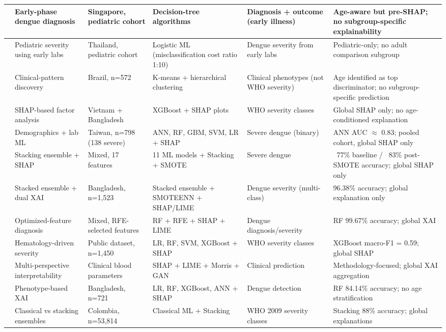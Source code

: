 \documentclass[12pt, a4paper]{report}
\begin{document}
\begin{xltabular}{\textwidth}{|c|X|X|X|X|X|}
\cite{tanner2008} & Early-phase dengue diagnosis & Singapore, pediatric cohort & Decision-tree algorithms & Diagnosis + outcome (early illness) & Age-aware but pre-SHAP; no subgroup-specific explainability \\
\hline
\cite{potts2010} & Pediatric severity using early labs & Thailand, pediatric cohort & Logistic ML (misclassification cost ratio 1:10) & Dengue severity from early labs & Pediatric-only; no adult comparison subgroup \\
\hline
\cite{rajapakse2014} & Clinical-pattern discovery & Brazil, n=572 & K-means + hierarchical clustering & Clinical phenotypes (not WHO severity) & Age identified as top discriminator; no subgroup-specific prediction \\
\hline
\cite{chowdhury2022} & SHAP-based factor analysis & Vietnam + Bangladesh & XGBoost + SHAP plots & WHO severity classes & Global SHAP only; no age-conditioned explanation \\
\hline
\cite{huang2020} & Demographics + lab ML & Taiwan, n=798 (138 severe) & ANN, RF, GBM, SVM, LR + SHAP & Severe dengue (binary) & ANN AUC $\approx$ 0.83; pooled cohort, global SHAP only \\
\hline
\cite{masum2025} & Stacking ensemble + SHAP & Mixed, 17 features & 11 ML models + Stacking + SMOTE & Severe dengue & ~77\% baseline / ~83\% post-SMOTE accuracy; global SHAP only \\
\hline
\cite{tuhin2025} & Stacked ensemble + dual XAI & Bangladesh, n=1,523 & Stacked ensemble + SMOTEENN + SHAP/LIME & Dengue severity (multi-class) & 96.38\% accuracy; global explanation only \\
\hline
\cite{das2025} & Optimized-feature diagnosis & Mixed, RFE-selected features & RF + RFE + SHAP + LIME & Dengue diagnosis/severity & RF 99.67\% accuracy; global XAI \\
\hline
\cite{niazi2026} & Hematology-driven severity & Public dataset, n=1,450 & LR, RF, SVM, XGBoost + SHAP & WHO severity classes & XGBoost macro-F1 = 0.59; global SHAP \\
\hline
\cite{haque2025} & Multi-perspective interpretability & Clinical blood parameters & SHAP + LIME + Morris + GAN & Clinical prediction & Methodology-focused; global XAI aggregation \\
\hline
\cite{joly2024} & Phenotype-based XAI & Bangladesh, n=721 & LR, RF, XGBoost, ANN + SHAP & Dengue detection & RF 84.14\% accuracy; no age stratification \\
\hline
\cite{arrubla2023} & Classical vs stacking ensembles & Colombia, n=53,814 & Classical ML + Stacking & WHO 2009 severity classes & Stacking 88\% accuracy; global explanations \\

\end{xltabular}
\end{document}
